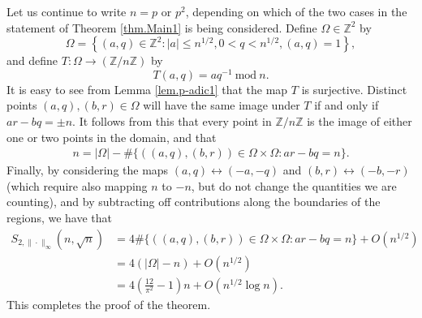 \documentclass[reqno]{amsart}
\newcommand{\Z}{\mathbb{Z}}
\newcommand{\rar}{\rightarrow}
\begin{document}
Let us continue to write $n=p$ or $p^2$, depending on which of the two cases in the statement of Theorem \ref{thm.Main1} is being considered. Define $\Omega\in\Z^2$ by
\[\Omega=\left\{(a,q)\in\Z^2: |a|\le n^{1/2}, 0<q<n^{1/2}, (a,q)=1\right\},\]
and define $T:\Omega\rar(\Z/n\Z)$ by
\[T(a,q)=aq^{-1}~\mathrm{mod}~n.\]
It is easy to see from Lemma \ref{lem.p-adic1} that the map $T$ is surjective. Distinct points $(a,q),(b,r)\in\Omega$ will have the same image under $T$ if and only if $ar-bq=\pm n$. It follows from this that every point in $\Z/n\Z$ is the image of either one or two points in the domain, and that
\begin{align*}
	n=|\Omega|-\#\{((a,q),(b,r))\in\Omega\times\Omega : ar-bq=n\}.
\end{align*}
Finally, by considering the maps $(a,q)\leftrightarrow (-a,-q)$ and $(b,r)\leftrightarrow (-b,-r)$ (which require also mapping $n$ to $-n$, but do not change the quantities we are counting), and by subtracting off contributions along the boundaries of the regions, we have that
\begin{align*}
S_{2,\|\cdot\|_\infty}(n,\sqrt{n})&=4\#\{((a,q),(b,r))\in\Omega\times\Omega : ar-bq=n\}+O(n^{1/2})\\
&=4\left(|\Omega|-n\right)+O(n^{1/2})\\
&=4\left(\frac{12}{\pi^2}-1\right)n+O(n^{1/2}\log n).
\end{align*}
This completes the proof of the theorem.
\end{document}
